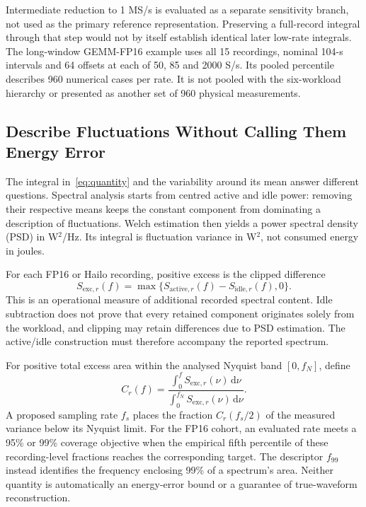 Intermediate reduction to 1 MS/s is evaluated as a separate sensitivity branch, not used as the primary reference representation. Preserving a full-record integral through that step would not by itself establish identical later low-rate integrals. The long-window GEMM-FP16 example uses all 15 recordings, nominal 104-s intervals and 64 offsets at each of 50, 85 and 2000 S/s. Its pooled percentile describes 960 numerical cases per rate. It is not pooled with the six-workload hierarchy or presented as another set of 960 physical measurements.

\subsection{Describe Fluctuations Without Calling Them Energy Error}
\label{sec:spectral-method}
The integral in~\eqref{eq:quantity} and the variability around its mean answer different questions. Spectral analysis starts from centred active and idle power: removing their respective means keeps the constant component from dominating a description of fluctuations. Welch estimation then yields a power spectral density (PSD) in W$^2$/Hz. Its integral is fluctuation variance in W$^2$, not consumed energy in joules.

For each FP16 or Hailo recording, positive excess is the clipped difference
\begin{equation}
S_{\mathrm{exc},r}(f)=\max\{S_{\mathrm{active},r}(f)-S_{\mathrm{idle},r}(f),0\}.
\label{eq:excess}
\end{equation}
This is an operational measure of additional recorded spectral content. Idle subtraction does not prove that every retained component originates solely from the workload, and clipping may retain differences due to PSD estimation. The active/idle construction must therefore accompany the reported spectrum.

For positive total excess area within the analysed Nyquist band $[0,f_N]$, define
\begin{equation}
C_r(f)=\frac{\int_0^f S_{\mathrm{exc},r}(\nu)\,\mathrm{d}\nu}
{\int_0^{f_N}S_{\mathrm{exc},r}(\nu)\,\mathrm{d}\nu}.
\label{eq:coverage}
\end{equation}
A proposed sampling rate $f_s$ places the fraction $C_r(f_s/2)$ of the measured variance below its Nyquist limit. For the FP16 cohort, an evaluated rate meets a 95\% or 99\% coverage objective when the empirical fifth percentile of these recording-level fractions reaches the corresponding target. The descriptor $f_{99}$ instead identifies the frequency enclosing 99\% of a spectrum's area. Neither quantity is automatically an energy-error bound or a guarantee of true-waveform reconstruction.

